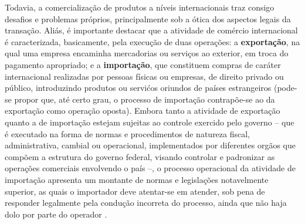 Todavia, a comercialização de produtos a níveis internacionais traz consigo desafios e problemas próprios, principalmente sob a ótica dos aspectos legais da transação. Aliás, é importante destacar que a atividade de comércio internacional é caracterizada, basicamente, pela execução de duas operações: a \textbf{exportação}, na qual uma empresa encaminha mercadorias ou serviços ao exterior, em troca do pagamento apropriado; e a \textbf{importação}, que constituem compras de caráter internacional realizadas por pessoas físicas ou empresas, de direito privado ou público, introduzindo produtos ou servićos oriundos de países estrangeiros (pode-se propor que, até certo grau, o processo de importação contrapõe-se ao da exportação como operação oposta). Embora tanto a atividade de exportação quanto a de importação estejam sujeitas ao controle exercido pelo governo -- que é executado na forma de normas e procedimentos de natureza fiscal, administrativa, cambial ou operacional, implementados por diferentes orgãos que compõem a estrutura do governo federal, visando controlar e padronizar as operações comerciais envolvendo o país --, o processo operacional da atividade de importação apresenta um montante de normas e legislações notavelmente superior, as quais o importador deve atentar-se em atender, sob pena de responder legalmente pela condução incorreta do processo, ainda que não haja dolo por parte do operador \cite{segalis2015fundamentos}. 

